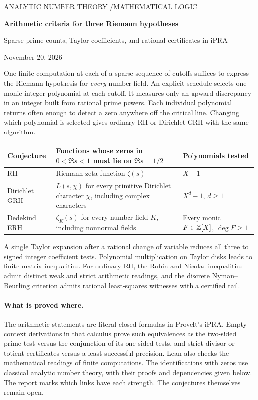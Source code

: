 \documentclass[11pt]{article}
\begin{document}
\thispagestyle{plain}
{\small\sffamily\color{teal} ANALYTIC NUMBER THEORY \enspace/\enspace MATHEMATICAL LOGIC}\par\vspace{12pt}
{\LARGE\bfseries\color{ink} Arithmetic criteria for three Riemann hypotheses}\par\vspace{5pt}
{\large Sparse prime counts, Taylor coefficients, and rational certificates in iPRA}\par\vspace{6pt}
{\small November 20, 2026}
\bigskip

One finite computation at each of a sparse sequence of cutoffs suffices to express the Riemann hypothesis for \emph{every} number field. An explicit schedule selects one monic integer polynomial at each cutoff. It measures only an upward discrepancy in an integer built from rational prime powers. Each individual polynomial returns often enough to detect a zero anywhere off the critical line. Changing which polynomial is selected gives ordinary RH or Dirichlet GRH with the same algorithm.

\begin{center}\small
\begin{tabular}{@{}p{.15\linewidth}p{.48\linewidth}p{.28\linewidth}@{}}\toprule
Conjecture & Functions whose zeros in $0<\Re s<1$ must lie on $\Re s=1/2$ & Polynomials tested\\\midrule
RH & Riemann zeta function $\zeta(s)$ & $X-1$\\[3pt]
Dirichlet GRH & $L(s,\chi)$ for every primitive Dirichlet character $\chi$, including complex characters & $X^d-1$, $d\ge1$\\[3pt]
Dedekind ERH & $\zeta_K(s)$ for every number field $K$, including nonnormal fields & Every monic $F\in\mathbb Z[X]$, $\deg F\ge1$\\\bottomrule
\end{tabular}
\end{center}

A single Taylor expansion after a rational change of variable reduces all three to signed integer coefficient tests. Polynomial multiplication on Taylor disks leads to finite matrix inequalities. For ordinary RH, the Robin and Nicolas inequalities admit distinct weak and strict arithmetic readings, and the discrete Nyman--Beurling criterion admits rational least-squares witnesses with a certified tail.

\paragraph{What is proved where.}
The arithmetic statements are literal closed formulas in ProveIt's iPRA. Empty-context derivations in that calculus prove such equivalences as the two-sided prime test versus the conjunction of its one-sided tests, and strict divisor or totient certificates versus a least successful precision. Lean also checks the mathematical readings of finite computations. The identifications with zeros use classical analytic number theory, with their proofs and dependencies given below. The report marks which links have each strength. The conjectures themselves remain open.

\tableofcontents
\newpage










\end{document}
